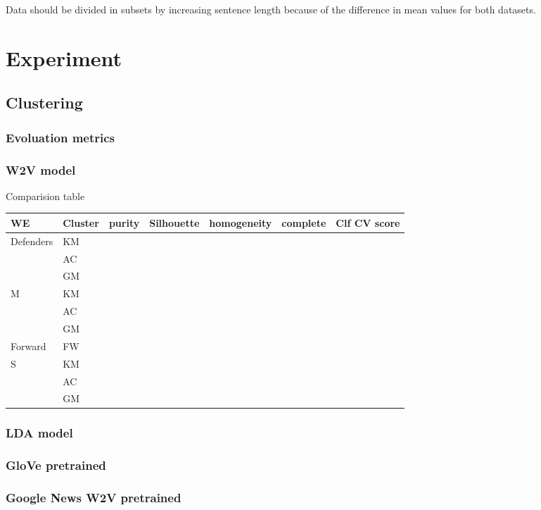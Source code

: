 \documentclass[11pt]{article}
\begin{document}
Data should be divided in subsets by increasing sentence length because of the difference in mean values for both datasets.



\section{Experiment}

\subsection{Clustering}
\subsubsection{Evoluation metrics}
\subsubsection{W2V model}

Comparision table

\begin{tabular}{ |p{2cm}|p{1cm}|c|c|c|c|p{1cm}| }
\hline
WE & Cluster & purity & Silhouette & homogeneity & complete & Clf CV score \\ \hline
\multirow{3}{*}{Defenders} & KM & & & & &\\
 & AC & & & & &\\
 & GM & & & & &\\ \hline
\multirow{3}{*}{M} & KM & & & & &\\
 & AC & & & & &\\
 & GM & & & & &\\ \hline
Forward & FW & & & & &\\ \hline
\multirow{3}{*}{S} & KM & & & & &\\
 & AC & & & & &\\
 & GM & & & & &\\
\hline
\end{tabular}


\subsubsection{LDA model}


\subsubsection{GloVe pretrained}

\subsubsection{Google News W2V pretrained}
\end{document}

